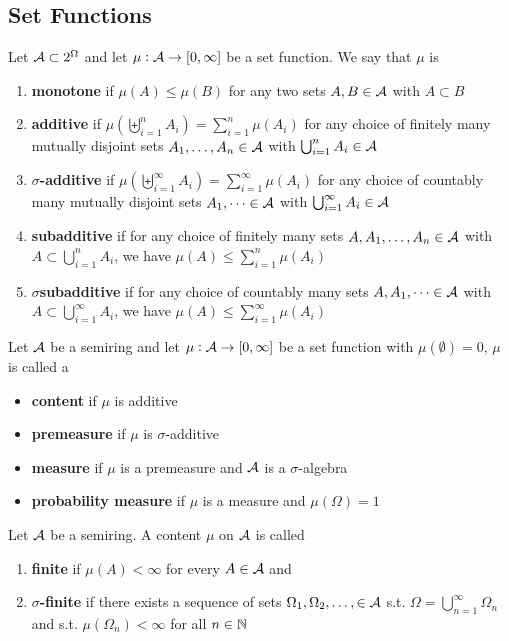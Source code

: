 \documentclass[11pt]{article}
\begin{document}
\subsection{Set Functions}
\label{sec:org6008a8a}
\begin{definition}[]
Let \(\mathcal{A}\subset2^\Omega\)  and let \(\mu:\mathcal{A}\to[0,\infty]\) be a set
function. We say that \(\mu\) is 
\begin{enumerate}
\item \textbf{monotone} if \(\mu(A)\le\mu(B)\) for any two sets \(A,B\in\mathcal{A}\) with
\(A\subset B\)
\item \textbf{additive} if \(\mu(\biguplus_{i=1}^n A_i)=\sum_{i=1}^n \mu(A_i)\) for any choice of
finitely many mutually disjoint sets \(A_1,\dots,A_n\in\mathcal{A}\) with 
\(\bigcup_{i=1}^n A_i\in\mathcal{A}\)
\item \textbf{\(\sigma\)-additive} if 
\(\mu(\biguplus_{i=1}^\infty A_i)=\sum_{i=1}^\infty \mu(A_i)\) for any choice of 
countably many mutually disjoint sets \(A_1,\dots\in\mathcal{A}\) with 
\(\bigcup_{i=1}^\infty A_i\in\mathcal{A}\)
\item \textbf{subadditive} if for any choice of finitely many sets
\(A,A_1,\dots,A_n\in\mathcal{A}\) with \(A\subset\bigcup_{i=1}^nA_i\), we have
\(\mu(A)\le\sum_{i=1}^n\mu(A_i)\)
\item \textbf{\(\sigma\)subadditive} if for any choice of countably many sets
\(A,A_1,\dots\in\mathcal{A}\) with \(A\subset\bigcup_{i=1}^\infty A_i\), we have
\(\mu(A)\le\sum_{i=1}^\infty\mu(A_i)\)
\end{enumerate}
\end{definition}

\begin{definition}[]
Let \(\mathcal{A}\) be a semiring and let \(\mu:\mathcal{A}\to[0,\infty]\) be a set function
with \(\mu(\emptyset)=0\), \(\mu\) is called a
\begin{itemize}
\item \textbf{content} if \(\mu\) is additive
\item \textbf{premeasure} if \(\mu\) is \(\sigma\)-additive
\item \textbf{measure} if \(\mu\) is a premeasure and \(\mathcal{A}\) is a \(\sigma\)-algebra
\item \textbf{probability measure} if \(\mu\) is a measure and \(\mu(\Omega)=1\)
\end{itemize}
\end{definition}

\begin{definition}[]
Let \(\mathcal{A}\) be a semiring. A content \(\mu\) on \(\mathcal{A}\) is called
\begin{enumerate}
\item \textbf{finite} if \(\mu(A)<\infty\) for every \(A\in\mathcal{A}\) and
\item \textbf{\(\sigma\)-finite} if there exists a sequence of sets
\(\Omega_1,\Omega_2,\dots,\in\mathcal{A}\) s.t.
\(\Omega=\bigcup_{n=1}^\infty\Omega_n\) and s.t. \(\mu(\Omega_n)<\infty\)
for all \(n\in\mathbb{N}\)
\end{enumerate}
\end{definition}
\end{document}
